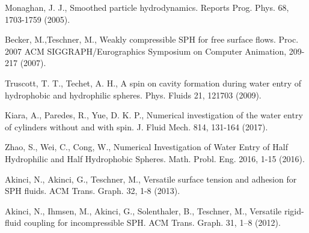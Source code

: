 \documentclass{jsarticle}
\begin{document}
\begin{thebibliography}{99}

  Monaghan, J. J., Smoothed particle hydrodynamics. Reports Prog. Phys. 68, 1703-1759 (2005).
  
  Becker, M.,Teschner, M., Weakly compressible SPH for free surface flows. Proc. 2007 ACM SIGGRAPH/Eurographics Symposium on Computer Animation, 209-217 (2007).
  
  Truscott, T. T., Techet, A. H., A spin on cavity formation during water entry of hydrophobic and hydrophilic spheres. Phys. Fluids 21, 121703 (2009).
  
  Kiara, A., Paredes, R., Yue, D. K. P., Numerical investigation of the water entry of cylinders without and with spin. J. Fluid Mech. 814, 131-164 (2017).
  
  Zhao, S., Wei, C., Cong, W., Numerical Investigation of Water Entry of Half Hydrophilic and Half Hydrophobic Spheres. Math. Probl. Eng. 2016, 1-15 (2016).
  
  Akinci, N., Akinci, G., Teschner, M., Versatile surface tension and adhesion for SPH fluids. ACM Trans. Graph. 32, 1-8 (2013).

  Akinci, N., Ihmsen, M., Akinci, G., Solenthaler, B., Teschner, M., Versatile rigid-fluid coupling for incompressible SPH. ACM Trans. Graph. 31, 1–8 (2012).
\end{thebibliography}
\end{document}
